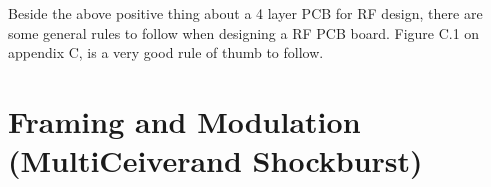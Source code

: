 Beside the above positive thing about a 4 layer PCB for RF design, there are some general rules to follow when designing a RF PCB board. Figure C.1 on appendix C, is a very good rule of thumb to follow.   



\section{Framing and Modulation (MultiCeiver\texttrademark and Shockburst\texttrademark)}


